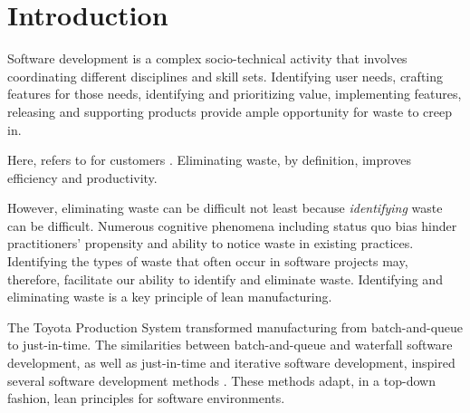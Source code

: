 \section{Introduction}

Software development is a complex socio-technical activity that involves coordinating different disciplines and skill sets. Identifying user needs, crafting features for those needs, identifying and prioritizing value, implementing features, releasing and supporting products provide ample opportunity for waste to creep in. 

Here,  refers to  for customers \cite{WomackLeanThinking}. Eliminating waste, by definition, improves efficiency and productivity. 

However, eliminating waste can be difficult not least because \textit{identifying} waste can be difficult.  Numerous cognitive phenomena including status quo bias \cite{JostDecadeOfSystemJustification} hinder practitioners' propensity and ability to notice waste in existing practices. Identifying the types of waste that often occur in software projects  may, therefore, facilitate our ability to identify and eliminate waste. Identifying and eliminating waste is a key principle of lean manufacturing. 

The Toyota Production System \cite{OhnoToyotaProductionSystem, ShingoToyotaProductionSystem} transformed manufacturing from batch-and-queue to just-in-time. The similarities between batch-and-queue and waterfall software development, as well as just-in-time and iterative software development, inspired several software development methods \cite{PoppendieckLeanSoftwareDevelopment, AndersonKanban}. These methods adapt, in a top-down fashion, lean principles for software environments. 

